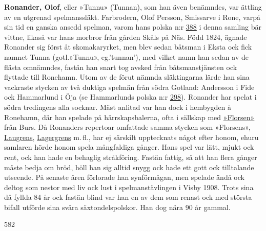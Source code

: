 \textbf{Ronander, Olof}, eller »Tunnu» (Tunnan), som han även benämndes, var ättling av en utgrenad spelmanssläkt.
Farbrodern, Olof Persson, Smissarve i Rone, varpå sin tid en ganska ansedd spelman, varom hans polska n:r \href{388}{388} i denna samling bär vittne, likaså var hans morbror från gården Skåls på Näs. Född 1824, ägnade Ronander sig först åt skomakaryrket, men blev sedan båtsman i Eksta ock fick namnet Tunna (gotl.\@ »Tunnu», eg.\@ 'tunnan'), med vilket namn han sedan av de flästa omnämndes, fastän han snart tog avsked från båtsmanstjänsten ock flyttade till Ronehamn. Utom av de förut nämnda släktingarna lärde han sina vackraste stycken av två duktiga spelmän från södra Gotland: Andersson i Fide ock Hammarlund i Öja (se Hammarlunds polska n:r \href{298}{298}). Ronander har spelat i södra tredingens alla socknar. Mäst anlitad var han dock i hembygden å Ronehamn, där han spelade på härrskapsbalerna, ofta i sällskap med \href{Florsen}{»Florsen»} från Burs. Då Ronanders repertoar omfattade samma stycken som »Florsens», \href{Laugren}{Laugrens}, \href{Lagergren}{Lagergrens} m.\,fl., har ej särskilt upptecknats något efter honom, ehuru samlaren hörde honom spela mångfaldiga gånger. Hans spel var lätt, mjukt ock rent, ock han hade en behaglig stråkföring. Fastän fattig, så att han flera gånger måste bedja om bröd, höll han sig alltid snygg ock hade ett gott ock tilltalande utseende. På senaste åren förlorade han synförmågan, men spelade ändå ock deltog som nestor med liv ock lust i spelmanstävlingen i Visby 1908. Trots sina då fyllda 84 år ock fastän blind var han en av dem som renast ock med största bifall utförde sina svåra säxtondelspolskor. Han dog nära 90 år gammal. 

582 
